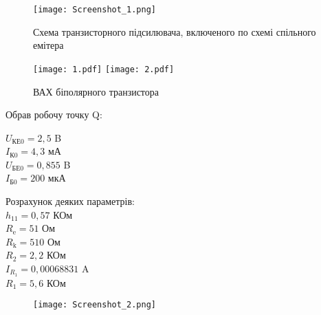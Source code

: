 \documentclass[a4paper,14pt]{extreport}
\begin{document}
\begin{figure}[h]
\begin{center}
\texttt{[image: Screenshot\_1.png]}
\caption{Схема транзисторного підсилювача, включеного по схемі спільного емітера}
\label{ris1}
\end{center}
\end{figure}

\begin{figure}[h]
\begin{center}
\texttt{[image: 1.pdf]}
\texttt{[image: 2.pdf]}
\caption{ВАХ біполярного транзистора}
\label{ris2}
\end{center}
\end{figure}


Обрав робочу точку Q:
\begin{center}
  $U_{\text{КЕ0}} = 2,5$ B\\
  $I_{\text{К0}} =  4,3$ мА\\
  $U_{\text{БЕ0}} = 0,855$ B\\
  $I_{\text{Б0}} =  200$ мкА\\
\end{center}
Розрахунок деяких параметрів:\\
  $h_{\text{11}} =  0,57$ КОм\\
  $R_{\text{e}} =  51$ Ом\\
  $R_{\text{k}} =  510$ Ом\\
  $R_{\text{2}} =  2,2$ КОм\\
  $I_{R_1} =  0,00068831$ A\\
  $R_{\text{1}} =  5,6$ КОм\\


  \begin{figure}[h]
  \begin{center}
  \texttt{[image: Screenshot\_2.png]}
  \label{ris1}
  \end{center}
  \end{figure}
\end{document}
